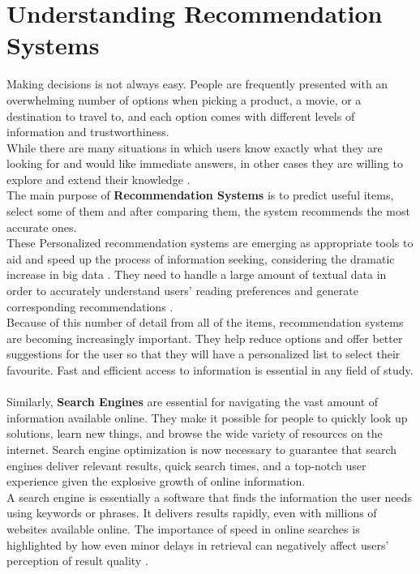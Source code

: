 \documentclass[\myFontSize,oneside,english,hidelinks,a4paper]{article}
\begin{document}
\section{Understanding Recommendation Systems}
Making decisions is not always easy. People are frequently presented with an overwhelming number of options when picking a product, a movie, or a destination to travel to, and each option comes with different levels of information and trustworthiness. \\
While there are many situations in which users know exactly what they are looking for and would like immediate answers, in other cases they are willing to explore and extend their knowledge \cite{Blanco201333}.\\
The main purpose of \textbf{Recommendation Systems} is to predict useful items, select some of them and after comparing them, the system recommends the most accurate ones.\\ 
These Personalized recommendation systems are emerging as appropriate tools to aid and speed up the process of information seeking, considering the dramatic increase in big data \cite{Haruna2017}. They need to handle a large amount of textual data in order to accurately understand users’ reading preferences and generate corresponding recommendations \cite{Yan2024}. \\
%
Because of this number of detail from all of the items, recommendation systems are becoming increasingly important. They help reduce options and offer better suggestions for the user so that they will have a personalized list to select their favourite. Fast and efficient access to information is essential in any field of study. \\\\
%
Similarly, \textbf{Search Engines} are essential for navigating the vast amount of information available online. They make it possible for people to quickly look up solutions, learn new things, and browse the wide variety of resources on the internet. Search engine optimization is now necessary to guarantee that search engines deliver relevant results, quick search times, and a top-notch user experience given the explosive growth of online information.\\
A search engine is essentially a software that finds the information the user needs using keywords or phrases. It delivers results rapidly, even with millions of websites available online.
The importance of speed in online searches is highlighted by how even minor delays in retrieval can negatively affect users' perception of result quality \cite{pub.1171882357}.\\
\end{document}
